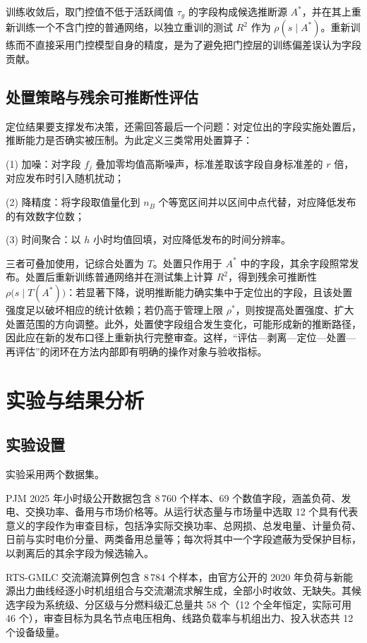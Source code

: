 \documentclass[UTF8,zihao=5,twoside]{ctexart}
\begin{document}
训练收敛后，取门控值不低于活跃阈值 $\tau_g$ 的字段构成候选推断源 $A^{\ast}$，并在其上重新训练一个不含门控的普通网络，以独立重训的测试 $R^2$ 作为 $\rho(s\mid A^{\ast})$。重新训练而不直接采用门控模型自身的精度，是为了避免把门控层的训练偏差误认为字段贡献。

\subsection{处置策略与残余可推断性评估}

定位结果要支撑发布决策，还需回答最后一个问题：对定位出的字段实施处置后，推断能力是否确实被压制。为此定义三类常用处置算子：

(1) 加噪：对字段 $f_j$ 叠加零均值高斯噪声，标准差取该字段自身标准差的 $r$ 倍，对应发布时引入随机扰动；

(2) 降精度：将字段取值量化到 $n_B$ 个等宽区间并以区间中点代替，对应降低发布的有效数字位数；

(3) 时间聚合：以 $h$ 小时均值回填，对应降低发布的时间分辨率。

三者可叠加使用，记综合处置为 $T$。处置只作用于 $A^{\ast}$ 中的字段，其余字段照常发布。处置后重新训练普通网络并在测试集上计算 $R^2$，得到残余可推断性 $\rho\big(s\mid T(A^{\ast})\big)$：若显著下降，说明推断能力确实集中于定位出的字段，且该处置强度足以破坏相应的统计依赖；若仍高于管理上限 $\rho^{\ast}$，则按提高处置强度、扩大处置范围的方向调整。此外，处置使字段组合发生变化，可能形成新的推断路径，因此应在新的发布口径上重新执行完整审查。这样，“评估—剥离—定位—处置—再评估”的闭环在方法内部即有明确的操作对象与验收指标。

\section{实验与结果分析}

\subsection{实验设置}

实验采用两个数据集。

PJM 2025 年小时级公开数据\cite{ref-pjm-dataminer}包含 8\,760 个样本、69 个数值字段，涵盖负荷、发电、交换功率、备用与市场价格等。从运行状态量与市场量中选取 12 个具有代表意义的字段作为审查目标，包括净实际交换功率、总网损、总发电量、计量负荷、日前与实时电价分量、两类备用总量等；每次将其中一个字段遮蔽为受保护目标，以剥离后的其余字段为候选输入。

RTS-GMLC 交流潮流算例\cite{ref-rtsgmlc}包含 8\,784 个样本，由官方公开的 2020 年负荷与新能源出力曲线经逐小时机组组合与交流潮流求解生成，全部小时收敛、无缺失。其候选字段为系统级、分区级与分燃料级汇总量共 58 个（12 个全年恒定，实际可用 46 个），审查目标为具名节点电压相角、线路负载率与机组出力、投入状态共 12 个设备级量。
\end{document}
